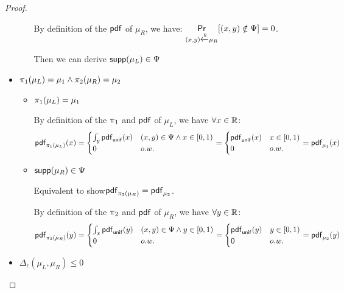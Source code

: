 \documentclass{article}
\begin{document}
\begin{proof}
\begin{itemize}
\begin{itemize}
		By definition of the $\mathsf{pdf}$ of $\mu_R$, we have: $\underset{(x,y) \xleftarrow{\$} \mu_R}{\mathsf{Pr}}[(x,y) \notin \Psi] = 0$.

		Then we can derive $\mathsf{supp}(\mu_L) \in \Psi$

	\end{itemize}		


	\item $\pi_1(\mu_L) = \mu_1 \land \pi_2(\mu_R) = \mu_2$
	
	\begin{itemize}
		\item $\pi_1(\mu_L) = \mu_1$ 


		By definition of the $\pi_1$ and $\mathsf{pdf}$ of $\mu_L$, we have $\forall x \in \mathbb{R}$:
		\[
			\mathsf{pdf}_{\pi_1(\mu_L)}(x) = 
			\begin{cases}
			\int_{y}\mathsf{pdf}_{\mathsf{unif}}(x) & (x,y) \in \Psi \land x \in [0, 1)\\
			0       & o.w.
			\end{cases} 
			= 
			\begin{cases}
			\mathsf{pdf}_{\mathsf{unif}}(x) & x \in [0, 1)\\
			0       & o.w.
			\end{cases}
			=
			\mathsf{pdf}_{\mu_1}(x)
		\]

		\item $\mathsf{supp}(\mu_R) \in \Psi$

		Equivalent to show$\mathsf{pdf}_{\pi_2(\mu_R)}  = \mathsf{pdf}_{\mu_2}$.

		By definition of the $\pi_2$ and $\mathsf{pdf}$ of $\mu_R$, we have $\forall y \in \mathbb{R}$:
		\[
			\mathsf{pdf}_{\pi_2(\mu_R)}(y) = 
			\begin{cases}
			\int_{x}\mathsf{pdf}_{\mathsf{unif}}(y) & (x,y) \in \Psi \land y \in [0, 1)\\
			0       & o.w.
			\end{cases} 
			= 
			\begin{cases}
			\mathsf{pdf}_{\mathsf{unif}}(y) & y \in [0, 1)\\
			0       & o.w.
			\end{cases}
			=
			\mathsf{pdf}_{\mu_2}(y)
		\]
	\end{itemize}	

	\item $\Delta_{\epsilon}(\mu_L, \mu_R) \leq 0$


\end{itemize}
\end{proof}
\end{document}
